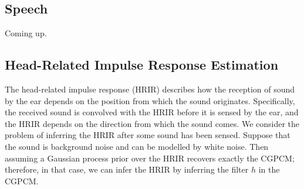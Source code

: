 \documentclass{article}
\newcommand{\cond}{\, | \,}               %
\begin{document}
\subsection{Speech}
Coming up.



\subsection{Head-Related Impulse Response Estimation}
The head-related impulse response (HRIR) describes how the reception of sound by the ear depends on the position from which the sound originates. Specifically, the received sound is convolved with the HRIR before it is sensed by the ear, and the HRIR depends on the direction from which the sound comes. We consider the problem of inferring the HRIR after some sound has been sensed. Suppose that the sound is background noise and can be modelled by white noise. Then assuming a Gaussian process prior over the HRIR recovers exactly the CGPCM; therefore, in that case, we can infer the HRIR by inferring the filter $h$ in the CGPCM.
\end{document}
